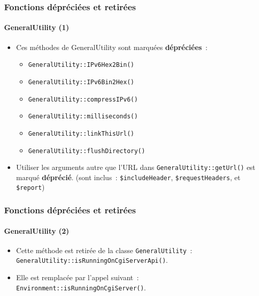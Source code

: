 \begin{frame}[fragile]
	\frametitle{Fonctions dépréciées et retirées}
	\framesubtitle{GeneralUtility (1)}

	\begin{itemize}
		\item Ces méthodes de GeneralUtility sont marquées \textbf{dépréciées}~:
			\begin{itemize}\smaller
				\item \texttt{GeneralUtility::IPv6Hex2Bin()}
				\item \texttt{GeneralUtility::IPv6Bin2Hex()}
				\item \texttt{GeneralUtility::compressIPv6()}
				\item \texttt{GeneralUtility::milliseconds()}
				\item \texttt{GeneralUtility::linkThisUrl()}
				\item \texttt{GeneralUtility::flushDirectory()}
			\end{itemize}\normalsize
			\vspace{0.4cm}

		\item Utiliser les arguments autre que l'URL dans \texttt{GeneralUtility::getUrl()}
			est marqué \textbf{déprécié}.\newline
			\smaller
				(sont inclus~: \texttt{\$includeHeader}, \texttt{\$requestHeaders}, et \texttt{\$report})
			\normalsize

	\end{itemize}

\end{frame}


\begin{frame}[fragile]
	\frametitle{Fonctions dépréciées et retirées}
	\framesubtitle{GeneralUtility (2)}

	\begin{itemize}
		\item Cette méthode est retirée de la classe \texttt{GeneralUtility}~:
			\texttt{GeneralUtility::isRunningOnCgiServerApi()}.
		\item Elle est remplacée par l'appel suivant~:\newline
			\texttt{Environment::isRunningOnCgiServer()}.

	\end{itemize}

\end{frame}

